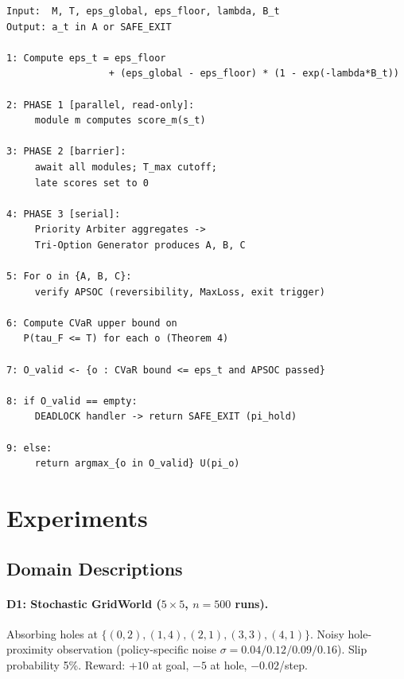 \begin{lstlisting}[basicstyle=\ttfamily\small,frame=single]
Input:  M, T, eps_global, eps_floor, lambda, B_t
Output: a_t in A or SAFE_EXIT

1: Compute eps_t = eps_floor
                  + (eps_global - eps_floor) * (1 - exp(-lambda*B_t))

2: PHASE 1 [parallel, read-only]:
     module m computes score_m(s_t)

3: PHASE 2 [barrier]:
     await all modules; T_max cutoff;
     late scores set to 0

4: PHASE 3 [serial]:
     Priority Arbiter aggregates ->
     Tri-Option Generator produces A, B, C

5: For o in {A, B, C}:
     verify APSOC (reversibility, MaxLoss, exit trigger)

6: Compute CVaR upper bound on
   P(tau_F <= T) for each o (Theorem 4)

7: O_valid <- {o : CVaR bound <= eps_t and APSOC passed}

8: if O_valid == empty:
     DEADLOCK handler -> return SAFE_EXIT (pi_hold)

9: else:
     return argmax_{o in O_valid} U(pi_o)
\end{lstlisting}

\section{Experiments}
\label{sec:arxiv-experiments}


\subsection{Domain Descriptions}
\label{sec:arxiv-domains}

\paragraph{D1: Stochastic GridWorld ($5 \times 5$, $n = 500$ runs).}
Absorbing holes at $\{(0, 2), (1, 4), (2, 1), (3, 3), (4, 1)\}$.
Noisy hole-proximity observation (policy-specific noise
$\sigma = 0.04 / 0.12 / 0.09 / 0.16$). Slip probability 5\%.
Reward: $+10$ at goal, $-5$ at hole, $-0.02$/step.

